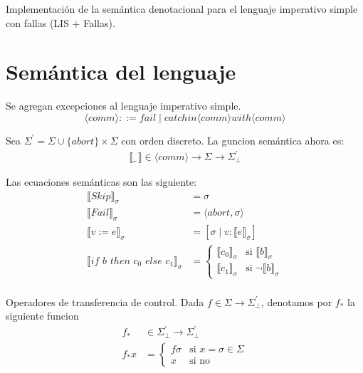 \documentclass[12pt,a4paper]{article}
\begin{document}
\maketitle{}

Implementación de la semántica denotacional para el lenguaje imperativo simple 
con fallas (LIS + Fallas).

\section{Semántica del lenguaje}
Se agregan excepciones al lenguaje imperativo simple.
$$\langle comm \rangle ::= fail \mid catchin \langle comm \rangle with \langle comm \rangle$$

Sea $\Sigma^{'} = \Sigma \cup \{ abort\} \times \Sigma$ con orden discreto. La guncion semántica ahora es:
\begin{align*}
\llbracket\_\,\rrbracket \in \langle comm \rangle \to \Sigma \to \Sigma^{'}_{\bot}
\end{align*}

Las ecuaciones semánticas son las siguiente:
\begin{align*}
\llbracket Skip \rrbracket_{\sigma} & = \sigma \\
\llbracket Fail\rrbracket_{\sigma} &= \langle abort, \sigma \rangle\\
\llbracket v := e\rrbracket_{\sigma} &= [\sigma\mid v : \llbracket e\rrbracket_{\sigma} ]\\
\llbracket if\,\, b\,\, then\,\, c_{0}\,\, else\,\, c_{1} \rrbracket_{\sigma} &= \begin{cases}
  \llbracket c_{0}\rrbracket_{\sigma} & \text{si}\,\, \llbracket b\rrbracket_{\sigma}\\
  \llbracket c_{1}\rrbracket_{\sigma} & \text{si}\,\, \neg \llbracket b\rrbracket_{\sigma}
\end{cases}\\
\end{align*}


Operadores de transferencia de control. Dada $f \in \Sigma \to \Sigma^{'}_{\bot}$,
denotamos por $f_{*}$ la siguiente funcion
\begin{align*}
f_{*} & \in \Sigma^{'}_{\bot} \to \Sigma^{'}_{\bot}\\
f_{*}x &= \begin{cases}
  f \sigma & \text{si}\,\, x = \sigma \in \Sigma\\
  x & \text{si no}
\end{cases}
\end{align*}
\end{document}
